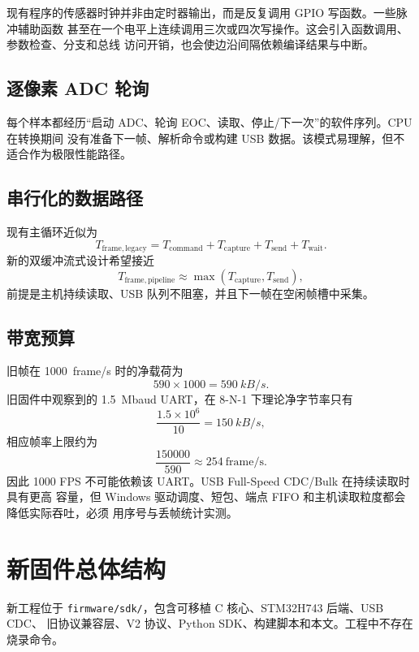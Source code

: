 \documentclass[UTF8,fontset=windows,11pt]{ctexart}
\newcommand{\code}[1]{\texttt{#1}}
\begin{document}
现有程序的传感器时钟并非由定时器输出，而是反复调用 GPIO 写函数。一些脉冲辅助函数
甚至在一个电平上连续调用三次或四次写操作。这会引入函数调用、参数检查、分支和总线
访问开销，也会使边沿间隔依赖编译结果与中断。

\subsection{逐像素 ADC 轮询}

每个样本都经历“启动 ADC、轮询 EOC、读取、停止/下一次”的软件序列。CPU 在转换期间
没有准备下一帧、解析命令或构建 USB 数据。该模式易理解，但不适合作为极限性能路径。

\subsection{串行化的数据路径}

现有主循环近似为
\[
T_{\mathrm{frame,legacy}}
=T_{\mathrm{command}}+T_{\mathrm{capture}}+T_{\mathrm{send}}+T_{\mathrm{wait}}.
\]
新的双缓冲流式设计希望接近
\[
T_{\mathrm{frame,pipeline}}
\approx \max(T_{\mathrm{capture}},T_{\mathrm{send}}),
\]
前提是主机持续读取、USB 队列不阻塞，并且下一帧在空闲帧槽中采集。

\subsection{带宽预算}

旧帧在 \SI{1000}{frame/s} 时的净载荷为
\[
590\times1000=\SI{590}{kB/s}.
\]
旧固件中观察到的 \SI{1.5}{Mbaud} UART，在 8-N-1 下理论净字节率只有
\[
\frac{1.5\times10^6}{10}=\SI{150}{kB/s},
\]
相应帧率上限约为
\[
\frac{150000}{590}\approx254\ \mathrm{frame/s}.
\]
因此 1000 FPS 不可能依赖该 UART。USB Full-Speed CDC/Bulk 在持续读取时具有更高
容量，但 Windows 驱动调度、短包、端点 FIFO 和主机读取粒度都会降低实际吞吐，必须
用序号与丢帧统计实测。

\section{新固件总体结构}

\begin{designbox}
新工程位于 \code{firmware/sdk/}，包含可移植 C 核心、STM32H743 后端、USB CDC、
旧协议兼容层、V2 协议、Python SDK、构建脚本和本文。工程中不存在烧录命令。
\end{designbox}
\end{document}
